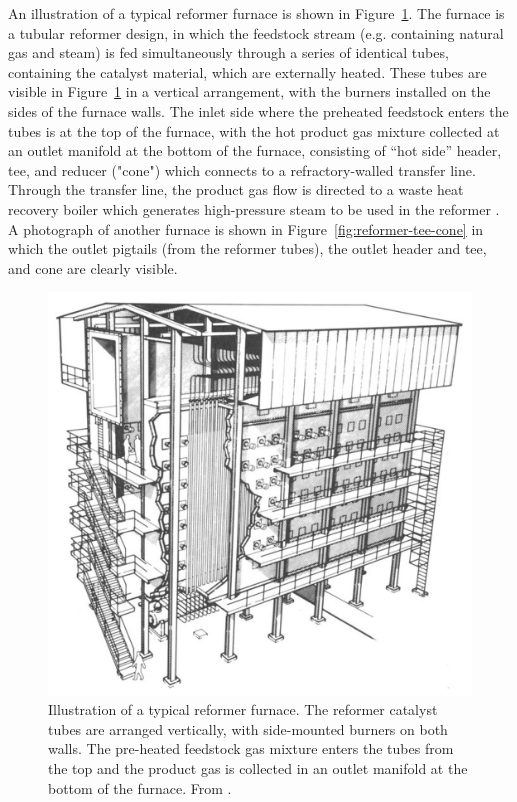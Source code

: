 An illustration of a typical reformer furnace is shown in Figure~\ref{fig:reformer-furnace}. The furnace is a tubular reformer design, in which the feedstock stream (e.g. containing natural gas and steam) is fed simultaneously through a series of identical tubes, containing the catalyst material, which are externally heated. These tubes are visible in Figure~\ref{fig:reformer-furnace} in a vertical arrangement, with the burners installed on the sides of the furnace walls. The inlet side where the preheated feedstock enters the tubes is at the top of the furnace, with the hot product gas mixture collected at an outlet manifold at the bottom of the furnace, consisting of ``hot side'' header, tee, and reducer ("cone") which connects to a refractory-walled transfer line. Through the transfer line, the product gas flow is directed to a waste heat recovery boiler which generates high-pressure steam to be used in the reformer \cite{rostrup-nielsen_catalytic_1984}. A photograph of another furnace is shown in Figure~\ref{fig:reformer-tee-cone} \cite{penso_repair_2006} in which the outlet pigtails (from the reformer tubes), the outlet header and tee, and cone are clearly visible.

\begin{figure}[h]
\centering
\includegraphics{figures/reformer-furnace}
\caption{Illustration of a typical reformer furnace. The reformer catalyst tubes are arranged vertically, with side-mounted burners on both walls. The pre-heated feedstock gas mixture enters the tubes from the top and the product gas is collected in an outlet manifold at the bottom of the furnace.  From \citet[Fig.~9]{rostrup-nielsen_catalytic_1984}.}
\label{fig:reformer-furnace}
\end{figure}

